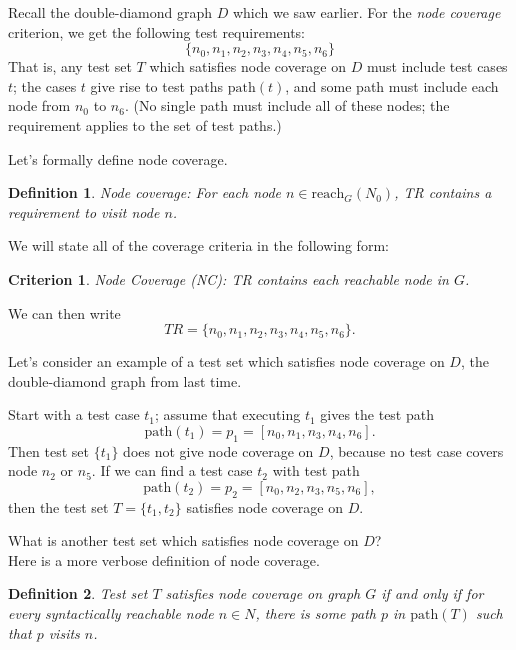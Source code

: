 \documentclass[11pt]{article}
\newtheorem{defn}{Definition}
\newtheorem{crit}{Criterion}
\begin{document}
Recall the double-diamond graph $D$ which we saw earlier.
For the \emph{node coverage} criterion, we get the following test requirements:
\[ \{ n_0, n_1, n_2, n_3, n_4, n_5, n_6 \} \]
That is, any test set $T$ which satisfies node coverage on $D$ must include
test cases $t$; the cases $t$ give rise to test paths $\mbox{path}(t)$, and
some path must include each node from $n_0$ to $n_6$. (No single path must
include all of these nodes; the requirement applies to the set of
test paths.)

Let's formally define node coverage.
\begin{defn}
Node coverage: For each node $n \in \mbox{reach}_G(N_0)$, \emph{TR} contains
a requirement to visit node $n$.
\end{defn}

We will state all of the coverage criteria in the following form:
\begin{crit}
Node Coverage (NC): \emph{TR} contains each reachable node in $G$.
\end{crit}

We can then write
\[ \mathit{TR} = \{ n_0, n_1, n_2, n_3, n_4, n_5, n_6\}. \]

Let's consider an example of a test set which satisfies node coverage
on $D$, the double-diamond graph from last time.

Start with a test case $t_1$; assume that executing $t_1$ gives the
test path 
\[ \mbox{path}(t_1) = p_1 = [n_0, n_1, n_3, n_4, n_6].\] 
Then
test set $\{ t_1\}$ does not give node coverage on $D$, because no
test case covers node $n_2$ or $n_5$. If we can find a test case $t_2$
with test path 
\[\mbox{path}(t_2) = p_2 = [n_0, n_2, n_3, n_5, n_6],\]
then the test set $T = \{ t_1, t_2 \}$ satisfies node coverage on $D$.

{\sf What is another test set which satisfies node coverage on $D$?}\\[2em]


Here is a more verbose definition of node coverage.

\begin{defn}
Test set $T$ satisfies \emph{node coverage} on graph $G$ if and only
if for every syntactically reachable node $n \in N$, there is some
path $p$ in $\mbox{path}(T)$ such that $p$ visits $n$.
\end{defn}
\end{document}

